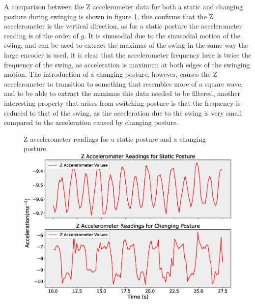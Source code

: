 \documentclass[11pt]{article}
\begin{document}
A comparison between the Z accelerometer data for both a static and changing posture during swinging is shown in figure \ref{fig:AccelerometerComparison}, this confirms that the Z accelerometer is the vertical direction, as for a static posture the accelerometer reading is of the order of $g$. It is sinusodial due to the sinusodial motion of the swing, and can be used to extract the maximas of the swing in the same way the large encoder is used, it is clear that the accelerometer frequency here is twice the frequency of the swing, as acceleration is maximum at both edges of the swinging motion. The introduction of a changing posture, however, causes the Z accelerometer to transition to something that resembles more of a square wave, and to be able to extract the maximas this data needed to be filtered, another interesting property that arises from switching posture is that the frequency is reduced to that of the swing, as the acceleration due to the swing is very small compared to the acceleration caused by changing posture.\\

    \begin{figure}[!htb]
        \centering
        \captionbox
             {Z accelerometer readings for a static posture and a changing posture.\label{fig:AccelerometerComparison}}
             {\includegraphics[width=1.0\textwidth]{AccelerometerComparison.eps}}
    \end{figure}
\end{document}

